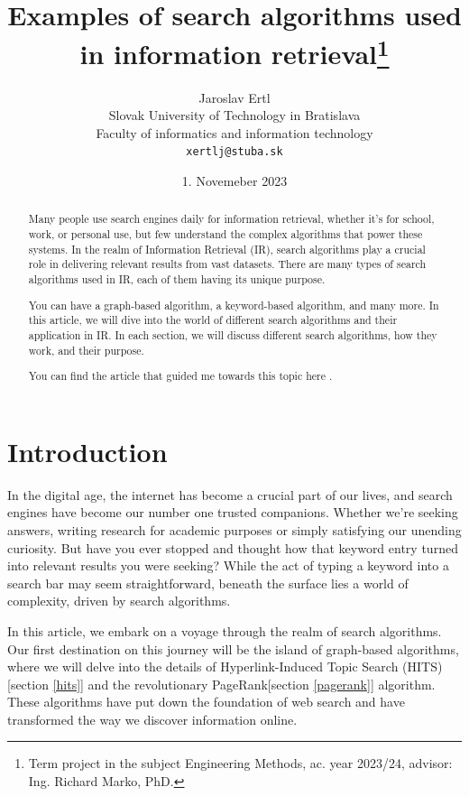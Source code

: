 \documentclass[10pt,english,a4paper]{article}
\title{Examples of search algorithms used in information retrieval\thanks{Term project in the subject Engineering Methods, ac. year 2023/24, advisor: Ing. Richard Marko, PhD.}}
\author{Jaroslav Ertl\\[2pt]
	{\small Slovak University of Technology in Bratislava}\\
	{\small Faculty of informatics and information technology}\\
	{\small \texttt{xertlj@stuba.sk}}
	}
\date{\small 1. Novemeber 2023}
\begin{document}
\maketitle
  
\begin{abstract}
    Many people use search engines daily for information retrieval, whether it's for school, work, or personal use, but few understand the complex algorithms that power these systems.  In the realm of Information Retrieval (IR), search algorithms play a crucial role in delivering relevant results from vast datasets. There are many types of search algorithms used in IR, each of them having its unique purpose. 

  You can have a graph-based algorithm, a keyword-based algorithm, and many more. In this article, we will dive into the world of different search algorithms and their application in IR. In each section, we will discuss different search algorithms, how they work, and their purpose.

  You can find the article that guided me towards this topic here \cite{prime_article}.
\end{abstract}
\section{Introduction}
In the digital age, the internet has become a crucial part of our lives, and search engines have become our number one trusted companions. Whether we're seeking answers, writing research for academic purposes or simply satisfying our unending curiosity. But have you ever stopped and thought how that keyword entry turned into relevant results you were seeking? While the act of typing a keyword into a search bar may seem straightforward, beneath the surface lies a world of complexity, driven by search algorithms. 

In this article, we embark on a voyage through the realm of search algorithms. Our first destination on this journey will be the island of graph-based algorithms, where we will delve into the details of Hyperlink-Induced Topic Search (HITS)[section \ref{hits}] and the revolutionary PageRank[section \ref{pagerank}] algorithm. These algorithms have put down the foundation of web search and have transformed the way we discover information online. 
\end{document}
